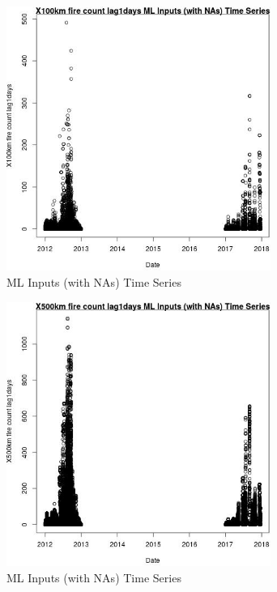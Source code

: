 \begin{figure} 
\centering  
\includegraphics[width=0.77\textwidth]{Code_Outputs/Report_ML_input_PM25_Step4_part_e_de_duplicated_aves_compiled_2019-05-14wNAs_X100km_fire_count_lag1daysvDate.jpg} 
\caption{\label{fig:Report_ML_input_PM25_Step4_part_e_de_duplicated_aves_compiled_2019-05-14wNAsX100km_fire_count_lag1daysvDate}ML Inputs (with NAs) Time Series} 
\end{figure} 
 

\begin{figure} 
\centering  
\includegraphics[width=0.77\textwidth]{Code_Outputs/Report_ML_input_PM25_Step4_part_e_de_duplicated_aves_compiled_2019-05-14wNAs_X500km_fire_count_lag1daysvDate.jpg} 
\caption{\label{fig:Report_ML_input_PM25_Step4_part_e_de_duplicated_aves_compiled_2019-05-14wNAsX500km_fire_count_lag1daysvDate}ML Inputs (with NAs) Time Series} 
\end{figure} 
 

